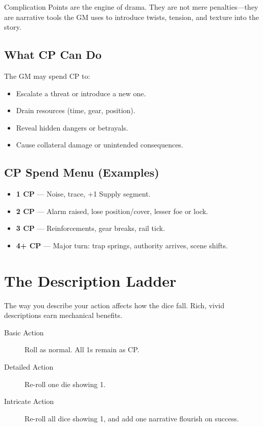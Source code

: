 Complication Points are the engine of drama. They are not mere penalties—they are narrative tools the GM uses to introduce twists, tension, and texture into the story.

\subsection*{What CP Can Do}

The GM may spend CP to:
\begin{itemize}
  \item Escalate a threat or introduce a new one.
  \item Drain resources (time, gear, position).
  \item Reveal hidden dangers or betrayals.
  \item Cause collateral damage or unintended consequences.
\end{itemize}

\subsection*{CP Spend Menu (Examples)}

\begin{itemize}
  \item \textbf{1 CP} — Noise, trace, +1 Supply segment.
  \item \textbf{2 CP} — Alarm raised, lose position/cover, lesser foe or lock.
  \item \textbf{3 CP} — Reinforcements, gear breaks, rail tick.
  \item \textbf{4+ CP} — Major turn: trap springs, authority arrives, scene shifts.
\end{itemize}

\section{The Description Ladder}

The way you describe your action affects how the dice fall. Rich, vivid descriptions earn mechanical benefits.

\begin{description}
  \item[Basic Action]  Roll as normal. All 1s remain as CP.
  \item[Detailed Action]  Re-roll one die showing 1.
  \item[Intricate Action]  Re-roll all dice showing 1, and add one narrative flourish on success.
\end{description}

